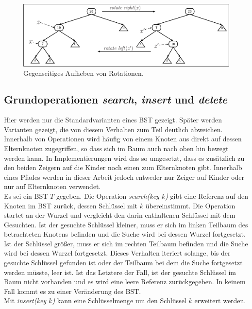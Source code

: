 \documentclass[a4paper,12pt]{article}
\begin{document}
\begin{figure}[H]
	\centering
	\includegraphics[width= 1\textwidth]{"Medien/Einleitung/LinksRechtsRotation"}
	\caption{Gegenseitiges Aufheben von Rotationen.}
	\label{fig:LinksRechtsRotation}
\end{figure}

\subsection{Grundoperationen \textit{search}, \textit{insert} und \textit{delete}} \label{BST Operationen}
Hier werden nur die Standardvarianten eines BST gezeigt. Später werden Varianten gezeigt, die von diesem Verhalten zum Teil deutlich abweichen. Innerhalb von Operationen wird häufig von einem Knoten aus direkt
auf dessen Elternknoten zugegriffen, so dass sich im Baum auch nach oben hin bewegt werden kann. In Implementierungen wird das so umgesetzt, dass es zusätzlich zu den beiden Zeigern auf die Kinder noch einen zum Elternknoten gibt. Innerhalb eines Pfades werden in dieser Arbeit jedoch entweder nur Zeiger auf Kinder oder nur auf Elternknoten verwendet.\\
 Es sei ein BST $T$ gegeben. Die Operation \textit{search(key $k$)} gibt eine Referenz auf den Knoten im BST zurück, dessen Schlüssel mit $k$ übereinstimmt. Die Operation startet an der Wurzel und vergleicht den darin enthaltenen Schlüssel mit dem Gesuchten. Ist der gesuchte Schlüssel kleiner, muss er sich im linken Teilbaum des betrachteten Knotens befinden und die Suche wird bei dessen Wurzel fortgesetzt. Ist der Schlüssel größer, muss er sich im rechten Teilbaum befinden und die Suche wird bei dessen Wurzel fortgesetzt. Dieses Verhalten iteriert solange, bis der gesuchte Schlüssel gefunden ist oder der Teilbaum bei dem die Suche fortgesetzt werden müsste, leer ist. Ist das Letztere der Fall, ist der gesuchte Schlüssel im Baum nicht vorhanden und es wird eine leere Referenz zurückgegeben. In keinem Fall kommt es zu einer Veränderung des BST.\\
Mit \textit{insert(key $k$)}  kann eine Schlüsselmenge um den Schlüssel $k$ erweitert werden. 
\end{document}
